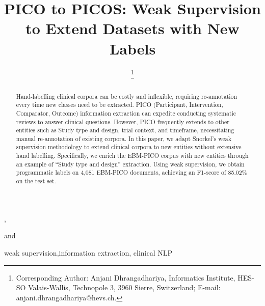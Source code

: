 \documentclass{IOS-Book-Article}
\def\hb{\hbox to 11.5 cm{}}
\begin{document}
\pagestyle{headings}
\def\thepage{}
\begin{frontmatter}              %


\title{PICO to PICOS: Weak Supervision to Extend Datasets with New Labels}

\author[A,B,C]{ %
\thanks{Corresponding Author: Anjani Dhrangadhariya, Informatics Institute, HES-SO Valais-Wallis, Technopole 3,
3960 Sierre, Switzerland; E-mail:
anjani.dhrangadhariya@hevs.ch.}},
\author[D]{ }
and
\author[A,B]{ }

\address[A]{Informatics Institute, HES-SO Valais-Wallis, Sierre, Switzerland}
\address[B]{University of Geneva (UNIGE), Geneva, Switzerland}
\address[C]{School of Health Sciences, HES-SO Valais-Wallis, Leukerbad, Switzerland}
\address[D]{Computational Health Research Branch, NLM, Bethesda, Maryland, USA.}
%
%
%
\begin{abstract}
Hand-labelling clinical corpora can be costly and inflexible, requiring re-annotation every time new classes need to be extracted.
PICO (Participant, Intervention, Comparator, Outcome) information extraction can expedite conducting systematic reviews to answer clinical questions.
However, PICO frequently extends to other entities such as Study type and design, trial context, and timeframe, necessitating manual re-annotation of existing corpora.
In this paper, we adapt Snorkel's weak supervision methodology to extend clinical corpora to new entities without extensive hand labelling.
Specifically, we enrich the EBM-PICO corpus with new entities through an example of ``Study type and design'' extraction.
Using weak supervision, we obtain programmatic labels on 4,081 EBM-PICO documents, achieving an F1-score of 85.02\% on the test set.
\end{abstract}

\begin{keyword}
weak supervision\sep information extraction\sep
clinical NLP
\end{keyword}
\end{frontmatter}
%
%
%
\end{document}
